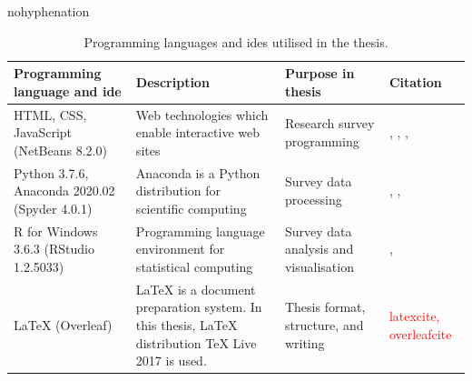\begin{hyphenrules}{nohyphenation}
    \begin{table}[H]
        \centering
        \caption[Thesis programming languages]{Programming languages and \glspl{ide} utilised in the thesis.} 
        \label{tab:used_langs}
        \def\arraystretch{1.3}
        \setlength\tabcolsep{1.2ex}
        \begin{tabular}{ @{} >{\raggedright\arraybackslash}p{3cm} >{\raggedright\arraybackslash}p{4.5cm} >{\raggedright\arraybackslash}p{3cm} >{\raggedleft\arraybackslash}p{3.5cm} @{} }
            \toprule
            Programming language and \gls{ide} & Description & Purpose in thesis & Citation \\
            \midrule
            HTML, CSS, JavaScript (NetBeans 8.2.0) & Web technologies which enable interactive web sites & Research survey programming  & \cite{WHATWG2020}, \cite{W3C2020}, \cite{ECMA2019}, \cite{ApacheSoftwareFoundation2016} \\
            Python 3.7.6, Anaconda 2020.02 (Spyder 4.0.1) & Anaconda is a Python distribution for scientific computing & Survey data processing & \cite{Python3Reference}, \cite{AnacondaInc.2020}, \cite{SpyderProjectContributors2020} \\
            R for Windows 3.6.3 (RStudio 1.2.5033) & Programming language environment for statistical computing & Survey data analysis and visualisation & \cite{RCoreTeam2020}, \cite{RStudioTeam2015} \\
            LaTeX (Overleaf) & LaTeX is a document preparation system. In this thesis, LaTeX distribution TeX Live 2017 is used. & Thesis format, structure, and writing & \textcolor{red}{latexcite, overleafcite} \\
            \bottomrule
        \end{tabular}
    \end{table} 
\end{hyphenrules}


